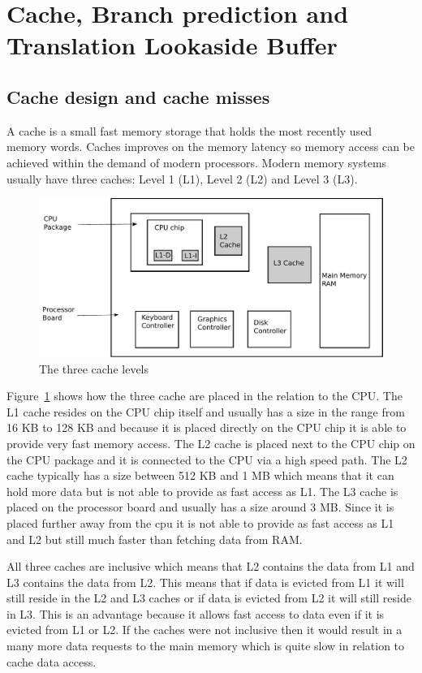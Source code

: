 \section{Cache, Branch prediction and Translation Lookaside Buffer}

\subsection{Cache design and cache misses}

A cache is a small fast memory storage that holds the most recently used memory words.
Caches improves on the memory latency so memory access can be achieved within the demand of modern processors.
Modern memory systems usually have three caches: Level 1 (L1), Level 2 (L2) and Level 3 (L3). 

\begin{figure}
\includegraphics[width=\textwidth]{CacheLevels.pdf}
\caption{The three cache levels}
\label{fig:CacheLevels}
\end{figure}

Figure~\ref{fig:CacheLevels} shows how the three cache are placed in the relation to the CPU. 
The L1 cache resides on the CPU chip itself and usually has a size in the range from 16 KB to 128 KB and because it is placed directly on the CPU chip it is able to provide very fast memory access.
The L2 cache is placed next to the CPU chip on the CPU package and it is connected to the CPU via a high speed path. The L2 cache typically has a size between 512 KB and 1 MB which means that it can hold more data but is not able to provide as fast access as L1.
The L3 cache is placed on the processor board and usually has a size around 3 MB. Since it is placed further away from the cpu it is not able to provide as fast access as L1 and L2 but still much faster than fetching data from RAM.

All three caches are inclusive which means that L2 contains the data from L1 and L3 contains the data from L2.
This means that if data is evicted from L1 it will still reside in the L2 and L3 caches or if data is evicted from L2 it will still reside in L3. 
This is an advantage because it allows fast access to data even if it is evicted from L1 or L2. 
If the caches were not inclusive then it would result in a many more data requests to the main memory which is quite slow in relation to cache data access.

